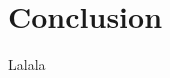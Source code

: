 \documentclass[sn-mathphys-num]{sn-jnl}
\numberwithin{equation}{section}
\begin{document}
 \section{Conclusion}
Lalala 


\appendix

\begin{comment}
\subsubsection{Snell's law... }
\noindent Finally, we consider a more elaborate example. We consider the initial conditions 
\begin{align*}
    u_0 (x,y) &= \frac{1}{100} \exp(-(80(x+y-t-1/5))^2) \vert_{t=0}, \\
    u_1(x,y) &= 128(x+y-t-1/5) \exp(-(80(x+y-t-1/5))^2) \vert_{t = 0}
\end{align*}
and compute a reference solution $u_{\text{ref}}$ numerically. We consider the data domain $\omega_T$ as described in Fig. \ref{fig:2d:SnellsLaw} and presribe $u = \Pi_h u_{\text{ref}}$ on $\omega_T$. 



\end{comment}
\end{document}
